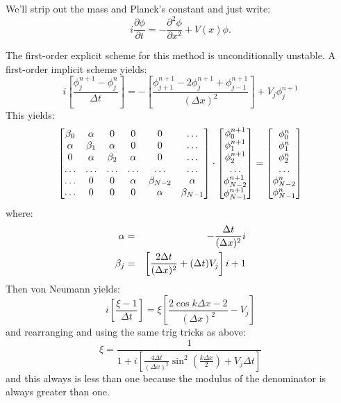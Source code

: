 We'll strip out the mass and Planck's constant and just write:
\begin{equation}
 i \frac{\partial\phi}{\partial t} = - \frac{\partial^2 \phi}{\partial x^2}
+ V(x)\phi.
\end{equation}

The first-order explicit scheme for this method is unconditionally
unstable. A first-order implicit scheme yields:
\begin{equation}
i \left[\frac{\phi_j^{n+1} - \phi_j^n}{\Delta t}\right]
= - \left[\frac{\phi_{j+1}^{n+1} - 2 \phi_{j}^{n+1}
+ \phi_{j-1}^{n+1}}{\left(\Delta x\right)^2} \right] +
V_j \phi_j^{n+1}
\end{equation}
This yields:
\begin{equation}
\left[
\begin{matrix}
\beta_0 & \alpha & 0 & 0 & 0 & \ldots\cr
\alpha & \beta_1 & \alpha & 0 & 0 &\ldots\cr
0 & \alpha & \beta_2 & \alpha & 0 & \ldots\cr
\ldots & \ldots & \ldots & \ldots & \ldots & \ldots \cr
\ldots & 0 & 0 & \alpha & \beta_{N-2} & \alpha \cr
\ldots & 0 & 0 & 0 & \alpha & \beta_{N-1} \cr
\end{matrix}
\right] \cdot
\left[
\begin{matrix}
\phi_0^{n+1} \cr
\phi_1^{n+1} \cr
\phi_2^{n+1} \cr
\ldots \cr
\phi_{N-2}^{n+1} \cr
\phi_{N-1}^{n+1} \cr
\end{matrix}\right]
 =
\left[
\begin{matrix}
\phi_0^{n} \cr
\phi_1^{n} \cr
\phi_2^{n} \cr
\ldots \cr
\phi_{N-2}^{n} \cr
\phi_{N-1}^{n} \cr
\end{matrix}\right]
\end{equation}
where:
\begin{eqnarray}
\alpha &=& - \frac{\Delta t}{(\Delta x)^2} i \cr
\beta_j &=& \left[\frac{2 \Delta t}{(\Delta x)^2} + (\Delta t) V_j\right] i + 1
\end{eqnarray}
Then von Neumann yields:
\begin{equation}
i \left[\frac{\xi - 1}{\Delta t}\right] =
\xi \left[ \frac{2 \cos k \Delta x - 2}{(\Delta x)^2} - V_j \right] 
\end{equation}
and rearranging and using the same trig tricks as above:
\begin{equation}
\xi = \frac{1}{1 + i \left[\frac{4 \Delta t}{(\Delta
x)^2} \sin^2\left(\frac{k \Delta x}{2}\right)+ V_j \Delta t\right]}
\end{equation}
and this always is less than one because the modulus of the
denominator is always greater than one.

